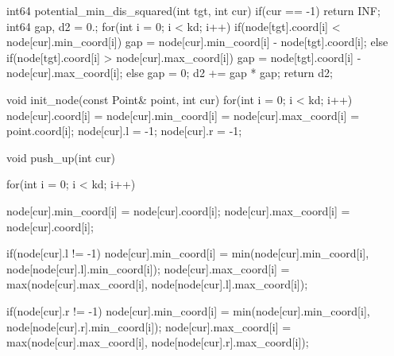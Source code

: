 \begin{codeline}[firstnumber=47]

    int64 potential_min_dis_squared(int tgt, int cur) {
        if(cur == -1) {
            return INF;
        }
        int64 gap, d2 = 0.;
        for(int i = 0; i < kd; i++) {
            if(node[tgt].coord[i] < node[cur].min_coord[i]) {
                gap = node[cur].min_coord[i] - node[tgt].coord[i];
            } else if(node[tgt].coord[i] > node[cur].max_coord[i]) {
                gap = node[tgt].coord[i] - node[cur].max_coord[i];
            } else {
                gap = 0;
            }
            d2 += gap * gap;
        }
        return d2;
    }

    void init_node(const Point& point, int cur) {
        for(int i = 0; i < kd; i++) {
            node[cur].coord[i] =
                node[cur].min_coord[i] =
                    node[cur].max_coord[i] = point.coord[i];
        }
        node[cur].l = -1;
        node[cur].r = -1;
    }

    void push_up(int cur) {
        for(int i = 0; i < kd; i++) {
            node[cur].min_coord[i] = node[cur].coord[i];
            node[cur].max_coord[i] = node[cur].coord[i];

            if(node[cur].l != -1) {
                node[cur].min_coord[i] = min(node[cur].min_coord[i], node[node[cur].l].min_coord[i]);
                node[cur].max_coord[i] = max(node[cur].max_coord[i], node[node[cur].l].max_coord[i]);
            }

            if(node[cur].r != -1) {
                node[cur].min_coord[i] = min(node[cur].min_coord[i], node[node[cur].r].min_coord[i]);
                node[cur].max_coord[i] = max(node[cur].max_coord[i], node[node[cur].r].max_coord[i]);
            }
        }
    }

\end{codeline}
\vspace{-0.9\baselineskip}
